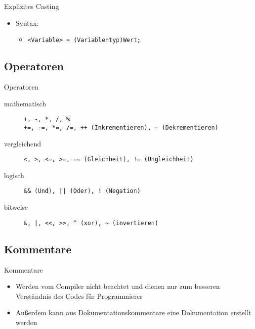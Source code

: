 \begin{frame}{Explizites Casting}
	\begin{itemize}
		\item Syntax:
		\begin{itemize}
			\item \texttt{\alert{<Variable>} = (\alert{Variablentyp})\alert{Wert};}
		\end{itemize}
	\end{itemize}
		
\end{frame}

\subsection{Operatoren}
\begin{frame}{Operatoren}
	\begin{description}
	    \item[mathematisch] \texttt{\alert{+}, \alert{-}, \alert{*}, \alert{/},	\alert{\%}}\\
	    \texttt{\alert{+=}, \alert{-=}, \alert{*=}, \alert{/=}, \alert{++} (Inkrementieren), \alert{--} (Dekrementieren)}
	    \item[vergleichend] \texttt{\alert{<}, \alert{>}, \alert{<=}, \alert{>=}, \alert{==} (Gleichheit), \alert{!=} (Ungleichheit)}
	    \item[logisch] \texttt{\alert{\&\&} (Und), \alert{||} (Oder), \alert{!} (Negation)}
	    \item[bitweise] \texttt{\alert{\&}, \alert{|}, \alert{<<}, \alert{>>}, \alert{\texttt{\^}} (xor), \alert{\texttt{\~}} (invertieren)}
	\end{description}
\end{frame}

\subsection{Kommentare}
\begin{frame}{Kommentare}
	\begin{itemize}
		\item Werden vom Compiler nicht beachtet und dienen nur zum besseren Verständnis des Codes für Programmierer
		\item Außerdem kann aus Dokumentationskommentare eine Dokumentation erstellt werden
	\end{itemize}
	
\end{frame}

